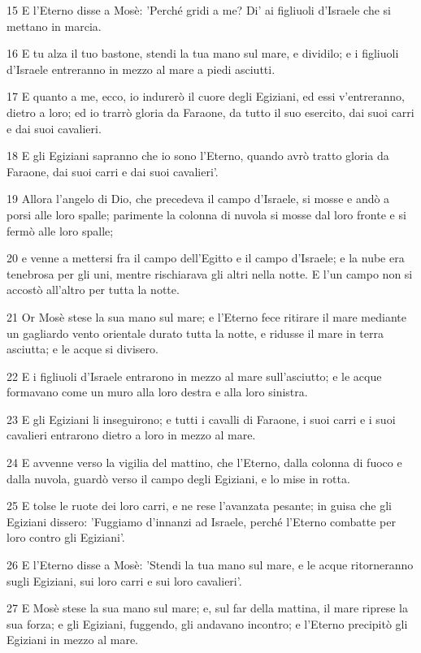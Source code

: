\par 15 E l'Eterno disse a Mosè: 'Perché gridi a me? Di' ai figliuoli d'Israele che si mettano in marcia.
\par 16 E tu alza il tuo bastone, stendi la tua mano sul mare, e dividilo; e i figliuoli d'Israele entreranno in mezzo al mare a piedi asciutti.
\par 17 E quanto a me, ecco, io indurerò il cuore degli Egiziani, ed essi v'entreranno, dietro a loro; ed io trarrò gloria da Faraone, da tutto il suo esercito, dai suoi carri e dai suoi cavalieri.
\par 18 E gli Egiziani sapranno che io sono l'Eterno, quando avrò tratto gloria da Faraone, dai suoi carri e dai suoi cavalieri'.
\par 19 Allora l'angelo di Dio, che precedeva il campo d'Israele, si mosse e andò a porsi alle loro spalle; parimente la colonna di nuvola si mosse dal loro fronte e si fermò alle loro spalle;
\par 20 e venne a mettersi fra il campo dell'Egitto e il campo d'Israele; e la nube era tenebrosa per gli uni, mentre rischiarava gli altri nella notte. E l'un campo non si accostò all'altro per tutta la notte.
\par 21 Or Mosè stese la sua mano sul mare; e l'Eterno fece ritirare il mare mediante un gagliardo vento orientale durato tutta la notte, e ridusse il mare in terra asciutta; e le acque si divisero.
\par 22 E i figliuoli d'Israele entrarono in mezzo al mare sull'asciutto; e le acque formavano come un muro alla loro destra e alla loro sinistra.
\par 23 E gli Egiziani li inseguirono; e tutti i cavalli di Faraone, i suoi carri e i suoi cavalieri entrarono dietro a loro in mezzo al mare.
\par 24 E avvenne verso la vigilia del mattino, che l'Eterno, dalla colonna di fuoco e dalla nuvola, guardò verso il campo degli Egiziani, e lo mise in rotta.
\par 25 E tolse le ruote dei loro carri, e ne rese l'avanzata pesante; in guisa che gli Egiziani dissero: 'Fuggiamo d'innanzi ad Israele, perché l'Eterno combatte per loro contro gli Egiziani'.
\par 26 E l'Eterno disse a Mosè: 'Stendi la tua mano sul mare, e le acque ritorneranno sugli Egiziani, sui loro carri e sui loro cavalieri'.
\par 27 E Mosè stese la sua mano sul mare; e, sul far della mattina, il mare riprese la sua forza; e gli Egiziani, fuggendo, gli andavano incontro; e l'Eterno precipitò gli Egiziani in mezzo al mare.
